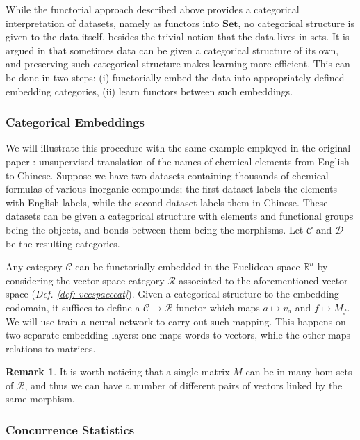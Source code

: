 \documentclass[12pt,a4paper,openright,twoside]{report}
\theoremstyle{plain}
\theoremstyle{definition}
\newtheorem{remark}[proposition]{Remark}
\begin{document}
While the functorial approach described above provides a categorical interpretation of datasets, namely as functors into $\mathbf{Set}$, no categorical structure is given to the data itself, besides the trivial notion that the data lives in sets. It is argued in \cite{sheshmani2021categorical} that sometimes data can be given a categorical structure of its own, and preserving such categorical structure makes learning more efficient. This can be done in two steps: (i) functorially embed the data into appropriately defined embedding categories, (ii) learn functors between such embeddings. 


\subsubsection{Categorical Embeddings}

We will illustrate this procedure with the same example employed in the original paper \cite{sheshmani2021categorical}: unsupervised translation of the names of chemical elements from English to Chinese. Suppose we have two datasets containing thousands of chemical formulas of various inorganic compounds; the first dataset labels the elements with English labels, while the second dataset labels them in Chinese. These datasets can be given a categorical structure with elements and functional groups being the objects, and bonds between them being the morphisms. Let $\mathcal{C}$ and $\mathcal{D}$ be the resulting categories.


Any category $\mathcal{C}$ can be functorially embedded in the Euclidean space $\mathbb{R}^n$ by considering the vector space category $\mathcal{R}$ associated to the aforementioned vector space (\textit{Def. \ref{def: vecspacecat}}). Given a categorical structure to the embedding codomain, it suffices to define a $\mathcal{C} \to \mathcal{R}$ functor which maps $a \mapsto v_a$ and $f \mapsto M_f$. We will use train a neural network to carry out such mapping. This happens on two separate embedding layers: one maps words to vectors, while the other maps relations to matrices.  

\begin{remark}
  It is worth noticing that a single matrix $M$ can be in many hom-sets of $\mathcal{R}$, and thus we can have a number of different pairs of vectors linked by the same morphism.
\end{remark}


\subsubsection{Concurrence Statistics}
\end{document}
